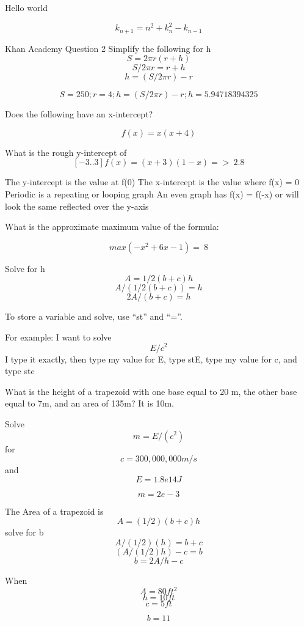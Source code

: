 \documentclass{article}
\begin{document}
Hello world


\begin{equation}
k_{n+1} = n^2 + k_n^2 - k_{n-1}
\end{equation}

Khan Academy Question 2
Simplify the following for h
\begin{equation}
S=2\pi r(r+h)
\end{equation}
\begin{equation}
S/2\pi r=r+h
\end{equation}
\begin{equation}
h=(S/2\pi r)-r
\end{equation}

\begin{equation}
  S=250;
  r=4;
  h=(S/2\pi r)-r;
  h= 5.94718394325
\end{equation}


Does the following have an x-intercept?

\begin{equation}
  f(x) = x(x+4)
\end{equation}


What is the rough y-intercept of $$[-3..3] f(x) = (x+3)(1-x) => ~2.8$$

The y-intercept is the value at f(0)
The x-intercept is the value where f(x) = 0
Periodic is a repeating or looping graph
An even graph has f(x) = f(-x) or will look the same reflected over the y-axis

What is the approximate maximum value of the formula:

\begin{equation}
  max(-x^2 + 6x - 1)  = ~8
\end{equation}


Solve for h
\begin{equation}
  A= 1/​2 ​​ (b+c)h
\end{equation}
\begin{equation}
  A/(1/2(b+c))= h
\end{equation}
\begin{equation}
  2A/(b+c)= h
\end{equation}

To store a variable and solve, use ``st'' and ``=''.

For example: I want to solve $$E/c^2$$
I type it exactly, then type my value for E, type stE, type my value for c, and type stc

What is the height of a trapezoid with one base equal to 20 m, the other base equal to 7m, and an area of 135m? It is 10m.


Solve $$m=E/(c^2)$$ for $$c = 300,000,000 m/s$$ and $$E = 1.8e14J$$

$$m = 2e-3$$

The Area of a trapezoid is $$A=(1/2)(b+c)h $$ solve for b
$$A/(1/2)(h)=b+c$$
$$(A/(1/2)h)-c=b$$
$$b = 2 A / h - c $$

When $$A=80ft^2$$ $$h=10ft$$ $$c=5ft$$

$$b=11$$
\end{document}
